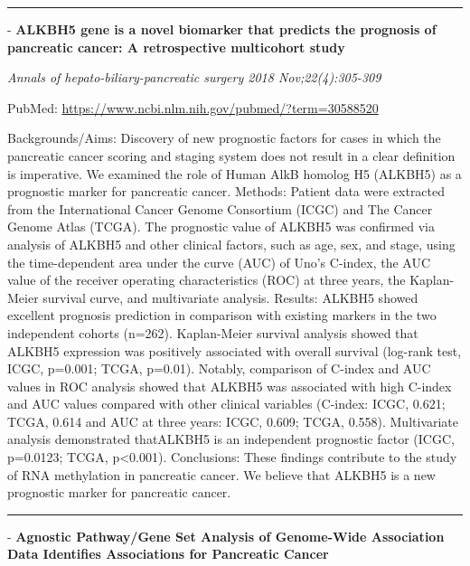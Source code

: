 \documentclass[]{article}
\begin{document}
{}

{}

\begin{center}\rule{0.5\linewidth}{\linethickness}\end{center}

 - \textbf{ALKBH5 gene is a novel biomarker that predicts the prognosis
of pancreatic cancer: A retrospective multicohort study}

\emph{Annals of hepato-biliary-pancreatic surgery 2018
Nov;22(4):305-309}

PubMed: \url{https://www.ncbi.nlm.nih.gov/pubmed/?term=30588520}

Backgrounds/Aims: Discovery of new prognostic factors for cases in which
the pancreatic cancer scoring and staging system does not result in a
clear definition is imperative. We examined the role of Human AlkB
homolog H5 (ALKBH5) as a prognostic marker for pancreatic cancer.
Methods: Patient data were extracted from the International Cancer
Genome Consortium (ICGC) and The Cancer Genome Atlas (TCGA). The
prognostic value of ALKBH5 was confirmed via analysis of ALKBH5 and
other clinical factors, such as age, sex, and stage, using the
time-dependent area under the curve (AUC) of Uno's C-index, the AUC
value of the receiver operating characteristics (ROC) at three years,
the Kaplan-Meier survival curve, and multivariate analysis. Results:
ALKBH5 showed excellent prognosis prediction in comparison with existing
markers in the two independent cohorts (n=262). Kaplan-Meier survival
analysis showed that ALKBH5 expression was positively associated with
overall survival (log-rank test, ICGC, p=0.001; TCGA, p=0.01). Notably,
comparison of C-index and AUC values in ROC analysis showed that ALKBH5
was associated with high C-index and AUC values compared with other
clinical variables (C-index: ICGC, 0.621; TCGA, 0.614 and AUC at three
years: ICGC, 0.609; TCGA, 0.558). Multivariate analysis demonstrated
thatALKBH5 is an independent prognostic factor (ICGC, p=0.0123; TCGA,
p\textless{}0.001). Conclusions: These findings contribute to the study
of RNA methylation in pancreatic cancer. We believe that ALKBH5 is a new
prognostic marker for pancreatic cancer.

{}

{}

\begin{center}\rule{0.5\linewidth}{\linethickness}\end{center}

 - \textbf{Agnostic Pathway/Gene Set Analysis of Genome-Wide Association
Data Identifies Associations for Pancreatic Cancer}
\end{document}
